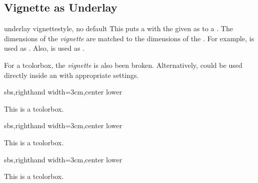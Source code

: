% 
% 
% 
% 



\subsection{Vignette as Underlay}\label{subsec:vignetteunderlay}

\begin{docTcbKey}[][doc new=2016-04-22]{underlay vignette}{}{style, no default}
  This puts a  with the given 
  as  to a .
  The dimensions of the \emph{vignette} are matched to the dimensions of
  the . For example,  is used as
  . Also,  is used as
  .

  For a  tcolorbox, the \emph{vignette} is also
  been broken.
  Alternatively,  could be used directly inside
  an  with appropriate settings.

\begin{dispExample*}{sbs,righthand width=3cm,center lower}
\begin{tcolorbox}[enhanced,size=small,sharp corners,
  colback=green!10,colframe=green!50!black,
  boxrule=2mm,titlerule=0mm,
  title=My title,center title,fonttitle=\bfseries,
  underlay vignette]
    This is a tcolorbox.
\end{tcolorbox}
\end{dispExample*}

\begin{dispExample*}{sbs,righthand width=3cm,center lower}
\begin{tcolorbox}[enhanced,size=small,arc=0pt,
  colback=blue!10,colframe=blue,boxrule=2mm,
  underlay vignette={size=1.5mm}]
    This is a tcolorbox.
\end{tcolorbox}
\end{dispExample*}

\begin{dispExample*}{sbs,righthand width=3cm,center lower}
\begin{tcolorbox}[enhanced,size=small,sharp corners,
  colframe=red,interior hidden,boxrule=2mm,
  colupper=white,center upper,fontupper=\bfseries,
  underlay vignette]
    This is a tcolorbox.
\end{tcolorbox}
\end{dispExample*}


\end{docTcbKey}
